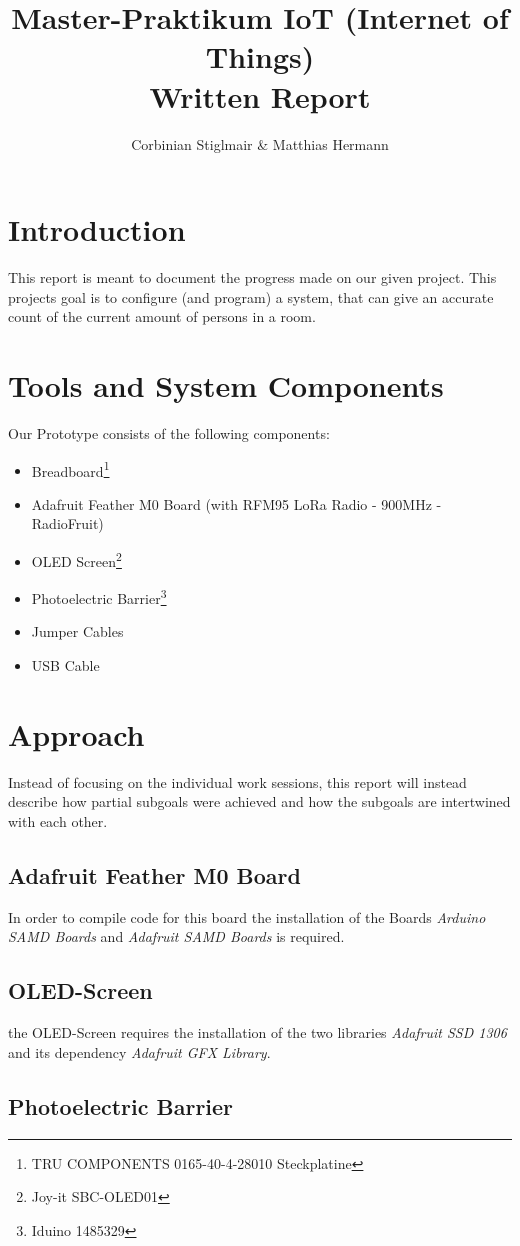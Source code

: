 \documentclass[]{article}
\title{Master-Praktikum IoT (Internet of Things)\\Written Report}
\author{Corbinian Stiglmair \& Matthias Hermann}
\begin{document}
\maketitle
\newpage
\tableofcontents
\newpage

\begin{sloppypar}
\section{Introduction}
This report is meant to document the progress made on our given project. This projects goal is to configure (and program) a system, that can give an accurate count of the current amount of persons in a room.
\section{Tools and System Components}
Our Prototype consists of the following components:
\begin{itemize}
	\item Breadboard\footnote{TRU COMPONENTS 0165-40-4-28010 Steckplatine}
	\item Adafruit Feather M0 Board (with RFM95 LoRa Radio - 900MHz - RadioFruit)
	\item OLED Screen\footnote{Joy-it SBC-OLED01}
	\item Photoelectric Barrier\footnote{Iduino 1485329}
	\item Jumper Cables
	\item USB Cable
\end{itemize}
\section{Approach}
Instead of focusing on the individual work sessions, this report will instead describe how partial subgoals were achieved and how the subgoals are intertwined with each other.
\subsection{Adafruit Feather M0 Board}
In order to compile code for this board the installation of the Boards \textit{Arduino SAMD Boards} and \textit{Adafruit SAMD Boards} is required.
\subsection{OLED-Screen}
the OLED-Screen requires the installation of the two libraries \textit{Adafruit SSD 1306} and its dependency \textit{Adafruit GFX Library}.
\subsection{Photoelectric Barrier}
\newpage
\printbibliography

\end{sloppypar}
\end{document}
